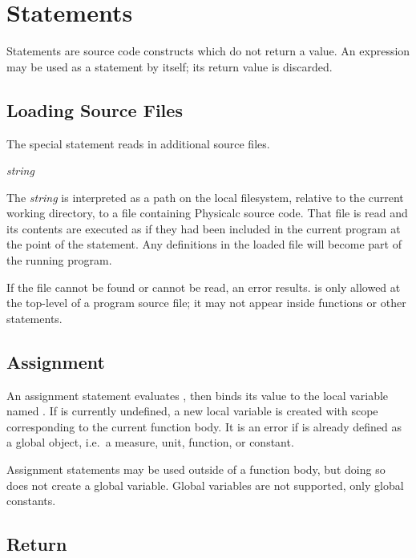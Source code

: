 \section{Statements}
\label{statements}

Statements are source code constructs which do not return a value.  An
expression may be used as a statement by itself; its return value is
discarded.


\subsection{Loading Source Files}

The special  statement reads in additional source files.
\begin{syntax}
 \textit{string}
\end{syntax}
The \textit{string} is interpreted as a path on the local filesystem,
relative to the current working directory, to a file containing
Physicalc source code.  That file is read and its contents are
executed as if they had been included in the current program at the
point of the  statement.  Any definitions in the loaded file
will become part of the running program.

If the file cannot be found or cannot be read, an error results.
 is only allowed at the top-level of a program source file;
it may not appear inside functions or other statements.


\subsection{Assignment}

\begin{syntax}
 \id{} \key{=} \expr{}
\end{syntax}

An assignment statement evaluates \expr{}, then binds its value to the
local variable named \id{}.  If \id{} is currently undefined, a new
local variable is created with scope corresponding to the current
function body.  It is an error if \id{} is already defined as a global
object, i.e.\ a measure, unit, function, or constant.

Assignment statements may be used outside of a function body, but
doing so does not create a global variable.  Global variables are not
supported, only global constants.


\subsection{Return}
\label{return-stmt}

